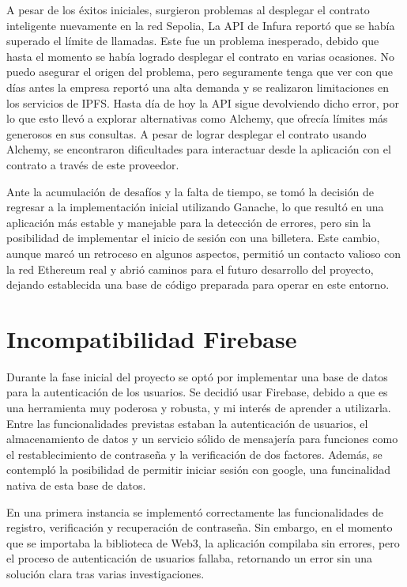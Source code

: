 A pesar de los éxitos iniciales, surgieron problemas al desplegar el contrato inteligente nuevamente en la red Sepolia, La API de Infura reportó que se había superado el límite de llamadas. 
Este fue un problema inesperado, debido que hasta el momento se había logrado desplegar el contrato en varias ocasiones. 
No puedo asegurar el origen del problema, pero seguramente tenga que ver con que días antes la empresa reportó una alta demanda y se realizaron limitaciones en los servicios de IPFS. 
Hasta día de hoy la API sigue devolviendo dicho error, por lo que esto llevó a explorar alternativas como Alchemy, que ofrecía límites más generosos en sus consultas. 
A pesar de lograr desplegar el contrato usando Alchemy, se encontraron dificultades para interactuar desde la aplicación con el contrato a través de este proveedor.

Ante la acumulación de desafíos y la falta de tiempo, se tomó la decisión de regresar a la implementación inicial utilizando Ganache, lo que resultó en una aplicación más estable y manejable para la detección de errores, pero sin la posibilidad de implementar el inicio de sesión con una billetera. Este cambio, aunque marcó un retroceso en algunos aspectos, permitió un contacto valioso con la red Ethereum real y abrió caminos para el futuro desarrollo del proyecto, dejando establecida una base de código preparada para operar en este entorno.



\section{Incompatibilidad Firebase}

Durante la fase inicial del proyecto se optó por implementar una base de datos para la autenticación de los usuarios.
Se decidió usar Firebase, debido a que es una herramienta muy poderosa y robusta, y mi interés de aprender a utilizarla. Entre las funcionalidades previstas estaban la autenticación de usuarios, el almacenamiento de datos y un servicio sólido de mensajería para funciones como el restablecimiento de contraseña y la verificación de dos factores.
Además, se contempló la posibilidad de permitir iniciar sesión con google, una funcinalidad nativa de esta base de datos.

En una primera instancia se implementó correctamente las funcionalidades de registro, verificación y recuperación de contraseña.
Sin embargo, en el momento que se importaba la biblioteca de Web3, la aplicación compilaba sin errores, pero el proceso de autenticación de usuarios fallaba, retornando un error sin una solución clara tras varias investigaciones.

